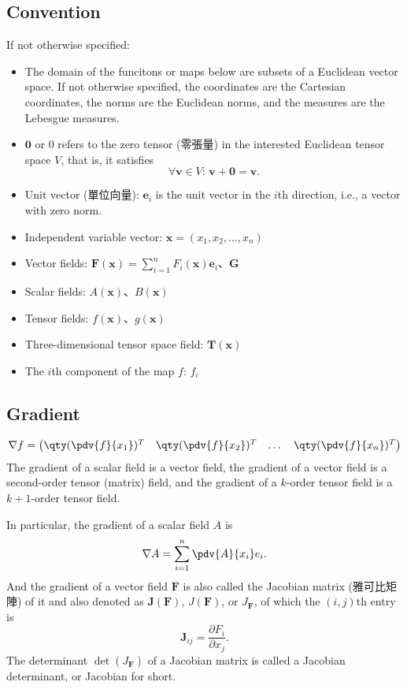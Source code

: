 \documentclass[a4paper,12pt]{report}
\begin{document}
\begin{itemize}
\begin{itemize}
\subsection{Convention}
If not otherwise specified:
\begin{itemize}
\item The domain of the funcitons or maps below are subsets of a Euclidean vector space. If not otherwise specified, the coordinates are the Cartesian coordinates, the norms are the Euclidean norms, and the measures are the Lebesgue measures.
\item $\mathbf{0}$ or $0$ refers to the zero tensor (零張量) in the interested Euclidean tensor space $V$, that is, it satisfies 
\[\forall\mathbf{v}\in V:\,\mathbf{v}+\mathbf{0}=\mathbf{v}.\]
\item Unit vector (單位向量): $\mathbf{e}_i$ is the unit vector in the $i$th direction, i.e., a vector with zero norm.
\item Independent variable vector: $\mathbf{x}=(x_1,x_2,\dots,x_n)$
\item Vector fields: $\mathbf{F}(\mathbf{x}) = \sum_{i=1}^n F_i(\mathbf{x}) \mathbf{e}_i$、$\mathbf{G}$
\item Scalar fields: $A(\mathbf{x})$、$B(\mathbf{x})$
\item Tensor fields: $f(\mathbf{x})$、$g(\mathbf{x})$
\item Three-dimensional tensor space field: $\mathbf{T}(\mathbf{x})$
\item The $i$th component of the map $f$: $f_i$
\end{itemize}
\subsection{Gradient}
\[
\nabla f = \begin{pmatrix}\qty(\pdv{f}{x_1})^T & \qty(\pdv{f}{x_2})^T & \dots  & \qty(\pdv{f}{x_n})^T\end{pmatrix}
\]
The gradient of a scalar field is a vector field, the gradient of a vector field is a second-order tensor (matrix) field, and the gradient of a $k$-order tensor field is a $k+1$-order tensor field. 

In particular, the gradient of a scalar field $A$ is
\[
\nabla A = \sum_{i=1}^n \pdv{A}{x_i}e_i.
\]
And the gradient of a vector field $\mathbf{F}$ is also called the Jacobian matrix (雅可比矩陣) of it and also denoted as $\mathbf{J}(\mathbf{F})$, $J(\mathbf{F})$, or $J_{\mathbf{F}}$, of which the $( i,j )$th entry is
\[\mathbf{J}_{ij}=\frac{\partial F_i}{\partial x_j}.\]
The determinant $\det\left(J_{\mathbf{F}}\right)$ of a Jacobian matrix is called a Jacobian determinant, or Jacobian for short.

\end{itemize}
\end{itemize}
\end{document}
